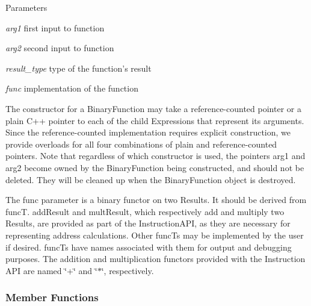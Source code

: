 \begin{DoxyParams}{Parameters}
\item[{\em arg1}]first input to function \item[{\em arg2}]second input to function \item[{\em result\_\-type}]type of the function's result \item[{\em func}]implementation of the function\end{DoxyParams}
The constructor for a BinaryFunction may take a reference-\/counted pointer or a plain C++ pointer to each of the child Expressions that represent its arguments. Since the reference-\/counted implementation requires explicit construction, we provide overloads for all four combinations of plain and reference-\/counted pointers. Note that regardless of which constructor is used, the pointers {\ttfamily arg1} and {\ttfamily arg2} become owned by the BinaryFunction being constructed, and should not be deleted. They will be cleaned up when the BinaryFunction object is destroyed.

The {\ttfamily func} parameter is a binary functor on two Results. It should be derived from {\ttfamily funcT}. {\ttfamily addResult} and {\ttfamily multResult}, which respectively add and multiply two Results, are provided as part of the InstructionAPI, as they are necessary for representing address calculations. Other {\ttfamily funcTs} may be implemented by the user if desired. funcTs have names associated with them for output and debugging purposes. The addition and multiplication functors provided with the Instruction API are named \char`\"{}+\char`\"{} and \char`\"{}$\ast$\char`\"{}, respectively. 

\subsubsection{Member Functions}
